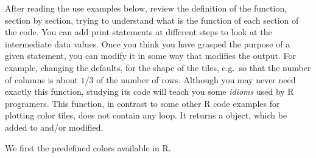\documentclass[krantz2]{krantz}\usepackage{knitr}%
\begin{document}
\begin{knitrout}
\begin{kframe}
\begin{alltt}
                              \hlstd{(}\hlopt{:} \hlopt{*}   \hlstd{=} \hlstd{)))}
  \hlkwb{<-}    
  
    \hlkwb{<-}  \hlopt{+} \hlstd{(} \hlstd{=} \hlstd{(} 
 \hlstd{\}}  \hlstd{\{}
    \hlkwb{<-}  \hlopt{+} \hlstd{(} \hlstd{=}   \hlstd{=} \hlstd{))}
 \hlstd{\}}
  \hlkwb{<-}  \hlopt{+}
    \hlstd{(} \hlstd{=} \hlstd{)} \hlopt{+}
    \hlstd{()} \hlopt{+}
    \hlstd{(}  \hlstd{(}  \hlopt{+}
    \hlstd{()}
  \hlopt{+} \hlstd{()}
\hlstd{\}}
\end{alltt}
\end{kframe}
\end{knitrout}

\begin{playground}
After reading the use examples below, review the definition of the function, section by section, trying to understand what is the function of each section of the code. You can add print statements at different steps to look at the intermediate data values. Once you think you have grasped the purpose of a given statement, you can modify it in some way that modifies the output. For example, changing the defaults, for the shape of the tiles, e.g.\ so that the number of columns is about $1/3$ of the number of rows. Although you may never need exactly this function, studying its code will teach you some \emph{idioms} used by R programers. This function, in contrast to some other R code examples for plotting color tiles, does not contain any loop. It returns a  object, which be added to and/or modified.
\end{playground}

We first the predefined colors available in R.
\end{document}
